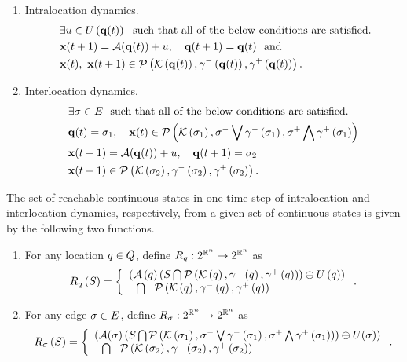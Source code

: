 \begin{enumerate}
\item Intralocation dynamics.
\begin{align}~\label{eqn:intralocation}
\begin{split}
& \exists u\in U\left({\bf q}(t)\right)~~\text{such that all of
    the below conditions  are satisfied.}\\
& {\bf x}(t+1) = \mathcal{A}({\bf q}(t))+u,~~~{\bf q}(t+1) = {\bf q}(t)~~
\text{and}\\
& {\bf x}(t),~{\bf x}(t+1)\in\mathcal{P}\left(\mathcal{K}\left({\bf q}(t)\right),\gamma^-\left({\bf q}(t)\right),\gamma^+\left({\bf q}(t)\right)\right).
\end{split}
\end{align}
\item Interlocation dynamics.
\begin{align} 
\begin{split}
& \exists \sigma\in E~~\text{such that all of the below
    conditions are satisfied.}\\
&
  {\bf q}(t)=\sigma_{1},~~~{\bf x}(t)\in\mathcal{P}\left(\mathcal{K}\left(\sigma_{1}\right),\sigma^-\bigvee\gamma^-\left(\sigma_{1}\right),\sigma^+\bigwedge\gamma^+\left(\sigma_{1}\right)\right) \\
& {\bf x}(t+1) = \mathcal{A}({\bf q}(t))+u,~~~{\bf q}(t+1) = \sigma_{2}\\
& {\bf x}(t+1)\in \mathcal{P}\left(\mathcal{K}\left(\sigma_{2}\right),\gamma^-\left(\sigma_{2}\right),\gamma^+\left(\sigma_{2}\right)\right).
\end{split}
\end{align}
\end{enumerate}

The set of reachable continuous states in one time step of
intralocation and interlocation dynamics, respectively, from a given
set of continuous states is given by the following two functions.
\begin{enumerate}
\item For any location $q\in Q$, define $R_{q}:2^{\mathbb{R}^n}\rightarrow 2^{\mathbb{R}^n}$ as
\begin{equation*}
R_{q}\left(S\right) = \left\{\begin{array}{l}{\left(\mathcal{A}\left(q\right)\left(S\bigcap\mathcal{P}\left(\mathcal{K}\left(q\right),\gamma^-\left(q\right),\gamma^+\left(q\right)\right)\right)\oplus
U\left(q\right)\right)}\\{~~\bigcap~~\mathcal{P}\left(\mathcal{K}\left(q\right),\gamma^-\left(q\right),\gamma^+\left(q\right)\right)} \end{array}\right..
\end{equation*}
\item For any edge $\sigma\in E$, define
  $R_{\sigma}:2^{\mathbb{R}^n}\rightarrow 2^{\mathbb{R}^n}$ as
\begin{multline*}
R_{\sigma}\left(S\right) =  \left\{\begin{array}{l}{\left(\mathcal{A}(\sigma)\left(S\bigcap
\mathcal{P}\left(\mathcal{K}\left(\sigma_{1}\right),\sigma^-\bigvee\gamma^-\left(\sigma_{1}\right),\sigma^+\bigwedge\gamma^+\left(\sigma_{1}\right)\right)\right)\oplus U(\sigma)\right)}\\{~~\bigcap~~\mathcal{P}\left(\mathcal{K}\left(\sigma_{2}\right),\gamma^-\left(\sigma_{2}\right),\gamma^+\left(\sigma_{2}\right)\right)} \end{array}\right..
\end{multline*}
\end{enumerate}

